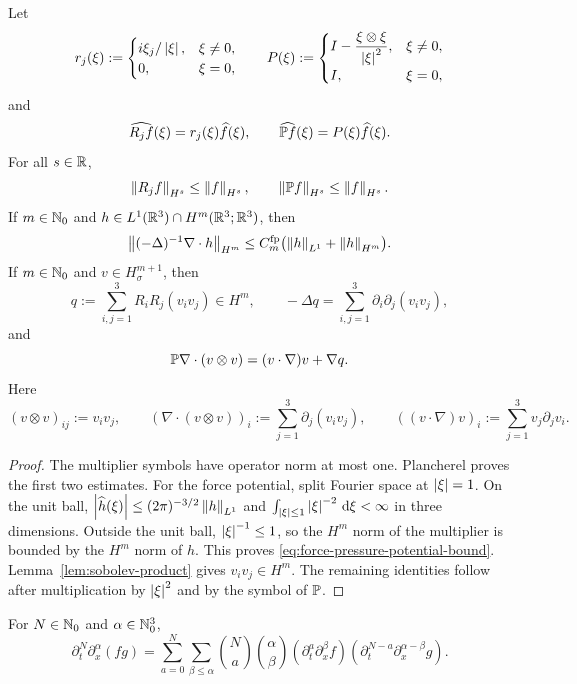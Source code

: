 \begin{lemma}
\label{lem:riesz-leray}
Let
\[
 r_j(\xi):=
 \begin{cases}
 i\xi_j/\left|\xi\right|,&\xi\ne0,\\
 0,&\xi=0,
 \end{cases}
 \qquad
 P(\xi):=
 \begin{cases}
 I-\dfrac{\xi\otimes\xi}{\left|\xi\right|^2},&\xi\ne0,\\
 I,&\xi=0,
 \end{cases}
\]
and
\[
 \widehat{R_jf}(\xi)=r_j(\xi)\widehat f(\xi),
 \qquad
 \widehat{\mathbb P f}(\xi)=P(\xi)\widehat f(\xi).
\]
For all \(s\in\mathbb R\),
\[
 \left\lVert R_jf\right\rVert_{H^s}\le\left\lVert f\right\rVert_{H^s},
 \qquad
 \left\lVert \mathbb P f\right\rVert_{H^s}\le\left\lVert f\right\rVert_{H^s}.
\]
If \(m\in\mathbb N_0\) and \(h\in L^1(\mathbb R^3)\cap H^m(\mathbb R^3;\mathbb R^3)\), then
\begin{equation}
 \left\lVert (-\Delta)^{-1}\nabla\cdot h\right\rVert_{H^m}
 \le C_m^{\rm fp}\bigl(\left\lVert h\right\rVert_{L^1}+\left\lVert h\right\rVert_{H^m}\bigr).
 \label{eq:force-pressure-potential-bound}
\end{equation}
If \(m\in\mathbb N_0\) and \(v\in H^{m+1}_\sigma\), then
\[
 q:=\sum_{i,j=1}^3R_iR_j(v_iv_j)\in H^m,
 \qquad
 -\Delta q=\sum_{i,j=1}^3\partial_i\partial_j(v_iv_j),
\]
and
\[
 \mathbb P\nabla\cdot(v\otimes v)
 =(v\cdot\nabla)v+\nabla q.
\]
Here
\[
 (v\otimes v)_{ij}:=v_iv_j,
 \qquad
 (\nabla\cdot(v\otimes v))_i
 :=\sum_{j=1}^3\partial_j(v_iv_j),
 \qquad
 ((v\cdot\nabla)v)_i:=\sum_{j=1}^3v_j\partial_jv_i.
\]
\end{lemma}

\begin{proof}
The multiplier symbols have operator norm at most one.  Plancherel proves the
first two estimates.  For the force potential, split Fourier space at
\(\left|\xi\right|=1\).  On the unit ball,
\(\left|\widehat h(\xi)\right|\le(2\pi)^{-3/2}\left\lVert h\right\rVert_{L^1}\) and
\(\int_{\left|\xi\right|\le1}\left|\xi\right|^{-2}\,\mathrm d\xi<\infty\) in three dimensions.
Outside the unit ball, \(\left|\xi\right|^{-1}\le1\), so the \(H^m\) norm of the
multiplier is bounded by the \(H^m\) norm of \(h\).  This proves
\eqref{eq:force-pressure-potential-bound}.  Lemma~\ref{lem:sobolev-product} gives
\(v_iv_j\in H^m\).  The remaining identities follow after multiplication by
\(\left|\xi\right|^2\) and by the symbol of \(\mathbb P\).
\end{proof}

\begin{lemma}
\label{lem:mixed-leibniz}
For \(N\in\mathbb N_0\) and \(\alpha\in\mathbb N_0^3\),
\[
 \partial_t^N\partial_x^\alpha(fg)
 =\sum_{a=0}^N\sum_{\beta\le\alpha}
 \binom Na\binom\alpha\beta
 (\partial_t^a\partial_x^\beta f)
 (\partial_t^{N-a}\partial_x^{\alpha-\beta}g).
\]
\end{lemma}

